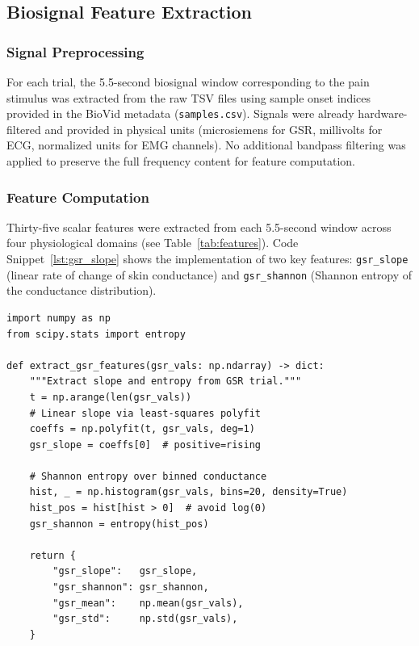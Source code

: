 \documentclass[10pt, twocolumn]{article}
\begin{document}
\subsection{Biosignal Feature Extraction}

\subsubsection{Signal Preprocessing}

For each trial, the 5.5-second biosignal window corresponding to the pain stimulus was
extracted from the raw TSV files using sample onset indices provided in the BioVid metadata
(\texttt{samples.csv}). Signals were already hardware-filtered and provided in physical
units (microsiemens for GSR, millivolts for ECG, normalized units for EMG channels). No
additional bandpass filtering was applied to preserve the full frequency content for feature
computation.

\subsubsection{Feature Computation}

Thirty-five scalar features were extracted from each 5.5-second window across four
physiological domains (see Table~\ref{tab:features}).
Code Snippet~\ref{lst:gsr_slope} shows the implementation of two key features:
\texttt{gsr\_slope} (linear rate of change of skin conductance) and
\texttt{gsr\_shannon} (Shannon entropy of the conductance distribution).

\begin{lstlisting}[caption={GSR slope and Shannon entropy extraction from a single trial window. \texttt{gsr\_vals} is a 1-D NumPy array of skin conductance values (microsiemens) over 5.5 seconds.}, label={lst:gsr_slope}]
import numpy as np
from scipy.stats import entropy

def extract_gsr_features(gsr_vals: np.ndarray) -> dict:
    """Extract slope and entropy from GSR trial."""
    t = np.arange(len(gsr_vals))
    # Linear slope via least-squares polyfit
    coeffs = np.polyfit(t, gsr_vals, deg=1)
    gsr_slope = coeffs[0]  # positive=rising

    # Shannon entropy over binned conductance
    hist, _ = np.histogram(gsr_vals, bins=20, density=True)
    hist_pos = hist[hist > 0]  # avoid log(0)
    gsr_shannon = entropy(hist_pos)

    return {
        "gsr_slope":   gsr_slope,
        "gsr_shannon": gsr_shannon,
        "gsr_mean":    np.mean(gsr_vals),
        "gsr_std":     np.std(gsr_vals),
    }
\end{lstlisting}
\end{document}
